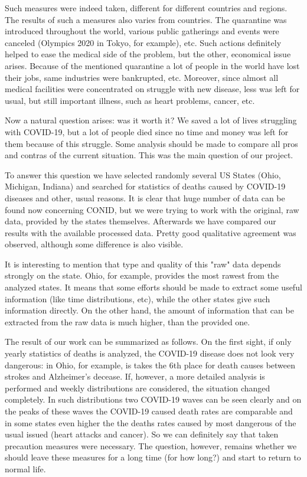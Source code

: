 \documentclass[conference]{IEEEtran}
\begin{document}
Such measures were indeed taken, different for different countries and regions. The results of such a measures also varies from countries. The quarantine was introduced throughout the world, various public gatherings and events were canceled (Olympics 2020 in Tokyo, for example), etc. Such actions definitely helped to ease the medical side of the problem, but the other, economical issue arises. Because of the mentioned quarantine a lot of people in the world have lost their jobs, same industries were bankrupted, etc. Moreover, since almost all medical facilities were concentrated on struggle with new disease, less was left for usual, but still important illness, such as heart problems, cancer, etc.

Now a natural question arises: was it worth it? We saved a lot of lives struggling with COVID-19, but a lot of people died since no time and money was left for them because of this struggle. Some analysis should be made to compare all pros and contras of the current situation. This was the main question of our project.

To answer this question we have selected randomly several US States (Ohio, Michigan, Indiana) and searched for statistics of deaths caused by COVID-19 diseases and other, usual reasons. It is clear that huge number of data can be found now concerning CONID, but we were trying to work with the original, raw data, provided by the states themselves. Afterwards we have compared our results with the available processed data. Pretty good qualitative agreement  was observed, although some difference is also visible.

It is interesting to mention that type and quality of this "raw" data depends strongly on the state. Ohio, for example, provides the most rawest from the analyzed states. It means that some efforts should be made to extract some useful information (like time distributions, etc), while the other states give such information directly. On the other hand, the amount of information that can be extracted from the raw data is much higher, than the provided one.

The result of our work can be summarized as follows. On the first sight, if only yearly statistics of deaths is analyzed, the COVID-19 disease does not look very dangerous: in Ohio, for example, is takes the 6th place for death causes between strokes and Alzheimer’s decease. If, however, a more detailed analysis is performed and weekly distributions are considered, the situation changed completely. In such distributions two COVID-19 waves can be seen clearly and on the peaks of these waves the COVID-19 caused death rates are comparable and in some states even higher the the deaths rates caused by most dangerous of the usual issued (heart attacks and cancer). So we can definitely say that taken precaution measures were necessary. The question, however, remains whether we should leave these measures for a long time (for how long?) and  start to return to normal life.
\end{document}
